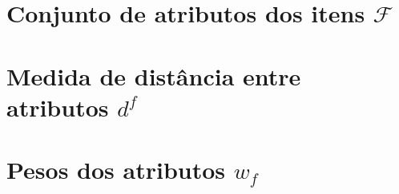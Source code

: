 \section{Conjunto de atributos dos itens
 $\mathcal{F}$} %
\label{sec:conjunto_de_atributos_dos_itens_}


\section{Medida de distância entre atributos $d^f$} %
\label{sec:medida_de_dist_ncia_entre_atributos_}


\section{Pesos dos atributos $w_f$} %
\label{sec:pesos_dos_atributos_}


